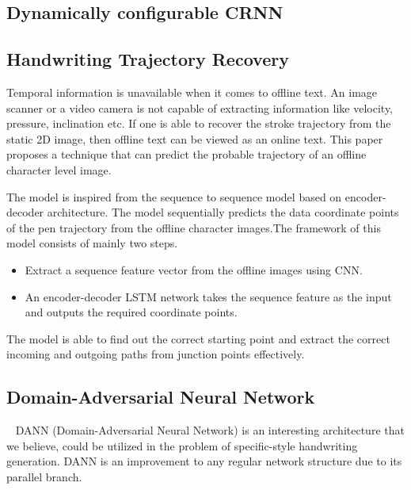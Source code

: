 \documentclass[10pt,twocolumn,letterpaper]{article}
\begin{document}
\subsection{Dynamically configurable CRNN}
\label{subsec: CRNN}

\subsection{Handwriting Trajectory Recovery}
\label{subsec: img2stroke}
Temporal information is unavailable when it comes to offline text. An image scanner or a video camera is not capable of extracting information like velocity, pressure, inclination etc. If one is able to recover the stroke trajectory from the static 2D image, then offline text can be viewed as an online text. This paper \cite{image2stroke-1Char} proposes a technique that can predict the probable trajectory of an offline character level image.

The model is inspired from the sequence to sequence model based on encoder-decoder architecture. The model sequentially predicts the data coordinate points of the pen trajectory from the offline character images.The framework of this model consists of mainly two steps.
\begin{itemize}
    \item Extract a sequence feature vector from the offline images using CNN.
    \item  An encoder-decoder LSTM network takes the sequence feature as the input and outputs the required coordinate points.
\end{itemize}

The model is able to find out the correct starting point and extract the correct incoming and outgoing paths from junction points effectively. 


\subsection{Domain-Adversarial Neural Network}
\label{subsec: DANN}
~\cite{DANN} DANN (Domain-Adversarial Neural Network) is an interesting architecture that we believe, could be utilized in the problem of specific-style handwriting generation. DANN is an improvement to any regular network structure due to its parallel branch.
\end{document}
